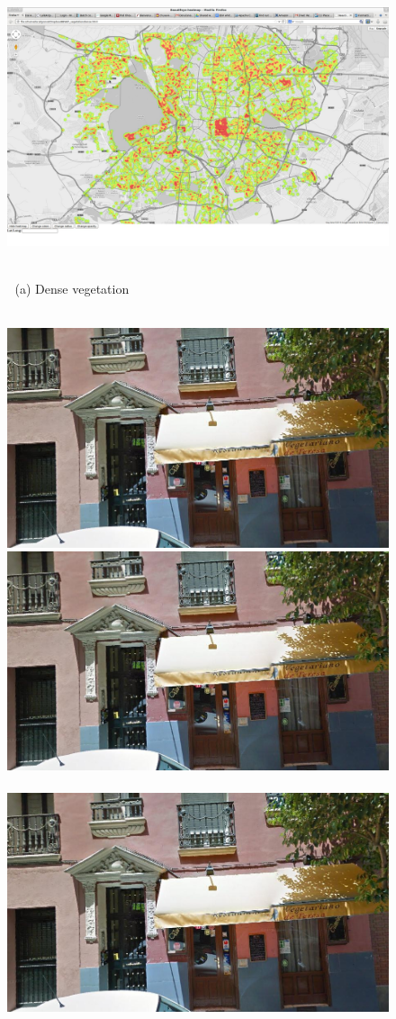 \documentclass[runningheads, table]{llncs}
\begin{document}
\begin{figure}
\begin{minipage}{\linewidth}
\begin{minipage}{0.3\linewidth}
    \end{minipage}
    \begin{minipage}{0.7\linewidth}
      \includegraphics[trim= 350 150 250 150, clip=true, width=\linewidth]{imgs/vege/mapT2.jpg}
    \end{minipage}
  \end{minipage}
  \\
  $\;$ \hspace{30mm} (a) Dense vegetation
  \\
  \\
  \begin{minipage}{\linewidth}
    \begin{minipage}{0.3\linewidth}
      \includegraphics[width=0.49\linewidth]{imgs/cutout_pitch04.jpg}
      \includegraphics[width=0.49\linewidth]{imgs/cutout_pitch04.jpg}
      \\ \vspace{-3mm} \\
      \includegraphics[width=0.49\linewidth]{imgs/cutout_pitch04.jpg}

\end{minipage}
\end{minipage}
\end{figure}
\end{document}
